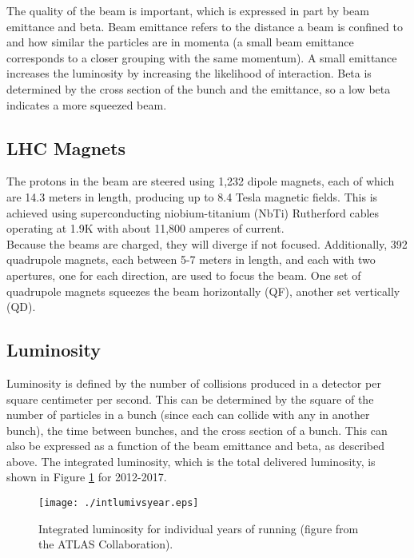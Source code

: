 The quality of the beam is important, which is expressed in part by beam emittance and beta.  Beam emittance refers to the distance a beam is confined to and how similar the particles are in momenta (a small beam emittance corresponds to a closer grouping with the same momentum).  A small emittance increases the luminosity by increasing the likelihood of interaction.  Beta is determined by the cross section of the bunch and the emittance, so a low beta indicates a more squeezed beam.\\


\subsection{LHC Magnets}

The protons in the beam are steered using 1,232 dipole magnets, each of which are 14.3 meters in length, producing up to 8.4 Tesla magnetic fields.  This is achieved using superconducting niobium-titanium (NbTi) Rutherford cables operating at 1.9K with about 11,800 amperes of current.  \\

Because the beams are charged, they will diverge if not focused.  Additionally, 392 quadrupole magnets, each between 5-7 meters in length, and each with two apertures, one for each direction, are used to focus the beam.  One set of quadrupole magnets squeezes the beam horizontally (QF), another set vertically (QD). \\%

\subsection{Luminosity}

Luminosity is defined by the number of collisions produced in a detector per square centimeter per second.  This can be determined by the square of the number of particles in a bunch (since each can collide with any in another bunch), the time between bunches, and the cross section of a bunch.  This can also be expressed as a function of the beam emittance and beta, as described above.  The integrated luminosity, which is the total delivered luminosity, is shown in Figure \ref{fig:intLum} for 2012-2017.\\

\begin{figure}[h!]
  \centering
	\texttt{[image: ./intlumivsyear.eps]}
\caption[Integrated luminosity for individual years of running]{\label{fig:intLum}{Integrated luminosity for individual years of running (figure from the ATLAS Collaboration). }} %
\end{figure}

